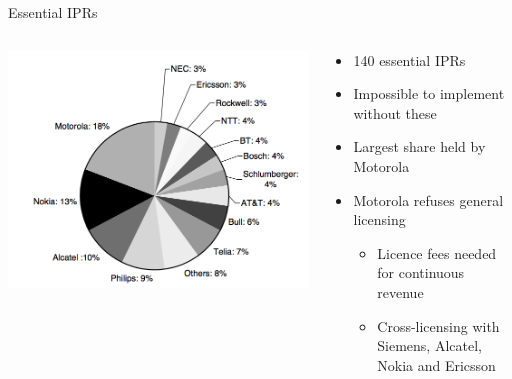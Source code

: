 \begin{frame}{Essential IPRs}
  \begin{columns}
      \begin{column}{0.6\textwidth}
          \includegraphics[width=\textwidth]{pictures/iprs}
      \end{column}
      \hfill
    
      \begin{column}{0.4\textwidth}
          \begin{itemize}
              \item 140 essential IPRs
              \item Impossible to implement without these 
              \item Largest share held by Motorola
              \item Motorola refuses general licensing
              \begin{itemize}
                \item Licence fees needed for continuous revenue
                \item Cross-licensing with Siemens, Alcatel, Nokia and Ericsson
              \end{itemize} 
          \end{itemize}
      \end{column}
      \end{columns}
\end{frame}

